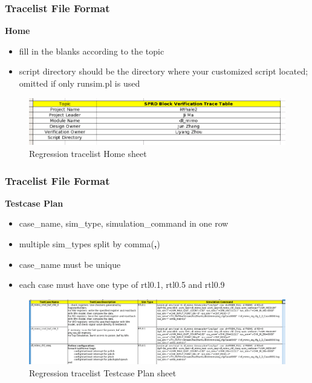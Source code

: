 \documentclass{beamer}
\begin{document}

\begin{frame}
  \frametitle{Tracelist File Format}
  \textbf{Home}
  \begin{itemize}
  \item fill in the blanks according to the topic
  \item script directory should be the directory where your customized script located; omitted if only runsim.pl is used
  \end{itemize}

  \begin{figure}
    \centering
    \includegraphics[width=0.9\linewidth]{home_sheet}
    \caption{Regression tracelist Home sheet}
  \end{figure}
\end{frame}


\begin{frame}
  \frametitle{Tracelist File Format}
  \textbf{Testcase Plan}
  \begin{itemize}
  \item case\_name, sim\_type, simulation\_command in one row
  \item multiple sim\_types split by comma(\textbf{,})
  \item case\_name must be unique
  \item each case must have one type of rtl0.1, rtl0.5 and rtl0.9
  \end{itemize}

  \begin{figure}
    \centering
    \includegraphics[width=\linewidth]{tp_sheet}
    \caption{Regression tracelist Testcase Plan sheet}
  \end{figure}
\end{frame}
\end{document}
